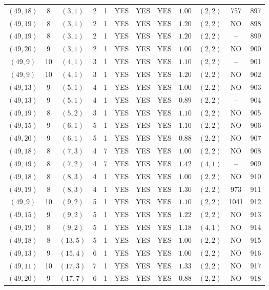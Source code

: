 \begin{longtable}{|c|c|c|c|c|c|c|c|c|c|c|c|}
$(49,18)$ & 8 & $(3,1)$ & 2 & 1 & YES & YES & YES & $1.00$ & $(2,2)$ & 757 & 897\\
$(49,19)$ & 8 & $(3,1)$ & 2 & 1 & YES & YES & YES & $1.20$ & $(2,2)$ & NO & 898\\
$(49,19)$ & 8 & $(3,1)$ & 2 & 1 & YES & YES & YES & $1.20$ & $(2,2)$ & -- & 899\\
$(49,20)$ & 9 & $(3,1)$ & 2 & 1 & YES & YES & YES & $1.00$ & $(2,2)$ & NO & 900\\
$(49,9)$ & 10 & $(4,1)$ & 3 & 1 & YES & YES & YES & $1.10$ & $(2,2)$ & -- & 901\\
$(49,9)$ & 10 & $(4,1)$ & 3 & 1 & YES & YES & YES & $1.20$ & $(2,2)$ & NO & 902\\
$(49,13)$ & 9 & $(5,1)$ & 4 & 1 & YES & YES & YES & $1.00$ & $(2,2)$ & NO & 903\\
$(49,13)$ & 9 & $(5,1)$ & 4 & 1 & YES & YES & YES & $0.89$ & $(2,2)$ & -- & 904\\
$(49,19)$ & 8 & $(5,2)$ & 3 & 1 & YES & YES & YES & $1.10$ & $(2,2)$ & NO & 905\\
$(49,15)$ & 9 & $(6,1)$ & 5 & 1 & YES & YES & YES & $1.10$ & $(2,2)$ & NO & 906\\
$(49,20)$ & 9 & $(6,1)$ & 5 & 1 & YES & YES & YES & $0.88$ & $(2,2)$ & NO & 907\\
$(49,18)$ & 8 & $(7,3)$ & 4 & 7 & YES & YES & YES & $1.00$ & $(2,2)$ & NO & 908\\
$(49,19)$ & 8 & $(7,2)$ & 4 & 7 & YES & YES & YES & $1.42$ & $(4,1)$ & -- & 909\\
$(49,18)$ & 8 & $(8,3)$ & 4 & 1 & YES & YES & YES & $1.00$ & $(2,2)$ & NO & 910\\
$(49,19)$ & 8 & $(8,3)$ & 4 & 1 & YES & YES & YES & $1.30$ & $(2,2)$ & 973 & 911\\
$(49,9)$ & 10 & $(9,2)$ & 5 & 1 & YES & YES & YES & $1.10$ & $(2,2)$ & 1041 & 912\\
$(49,15)$ & 9 & $(9,2)$ & 5 & 1 & YES & YES & YES & $1.22$ & $(2,2)$ & NO & 913\\
$(49,19)$ & 8 & $(9,2)$ & 5 & 1 & YES & YES & YES & $1.18$ & $(4,1)$ & NO & 914\\
$(49,18)$ & 8 & $(13,5)$ & 5 & 1 & YES & YES & YES & $1.00$ & $(2,2)$ & NO & 915\\
$(49,13)$ & 9 & $(15,4)$ & 6 & 1 & YES & YES & YES & $1.00$ & $(2,2)$ & NO & 916\\
$(49,11)$ & 10 & $(17,3)$ & 7 & 1 & YES & YES & YES & $1.33$ & $(2,2)$ & NO & 917\\
$(49,20)$ & 9 & $(17,7)$ & 6 & 1 & YES & YES & YES & $0.88$ & $(2,2)$ & NO & 918\\

\end{longtable}
